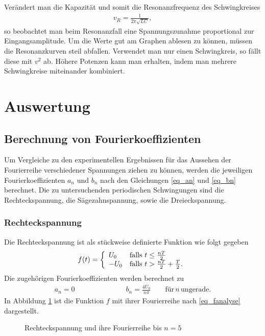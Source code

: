 Verändert man die Kapazität und somit die Resonanzfrequenz des Schwingkreises
\begin{align}
v_R=\frac{1}{2\pi\sqrt{LC}},
\end{align}
so beobachtet man beim Resonanzfall eine Spannungszunahme proportional zur Eingangsamplitude. Um die Werte gut am Graphen ablesen zu können, müssen die Resonanzkurven steil abfallen. Verwendet man nur einen Schwingkreis, so fällt diese mit $v^2$ ab. Höhere Potenzen kann man erhalten, indem man mehrere Schwingkreise miteinander kombiniert.
\section{Auswertung}
\subsection{Berechnung von Fourierkoeffizienten}
\label{sec_berechnung}
Um Vergleiche zu den experimentellen Ergebnissen für das Aussehen der Fourierreihe verschiedener Spannungen ziehen zu können, werden
die jeweiligen Fourierkoeffizienten $a_n$ und $b_n$ nach den Gleichungen \eqref{eq_an} und \eqref{eq_bn} berechnet. Die zu untersuchenden
periodischen Schwingungen sind die Rechteckspannung, die Sägezahnspannung, sowie die Dreieckspannung. 
\subsubsection{Rechteckspannung}
Die Rechteckspannung ist als stückweise definierte Funktion wie folgt gegeben
\begin{align*}			
f(t) =
\left\{
	\begin{array}{l l}
	U_0  & \text{falls } t \leq \frac{nT}{2}\\
	-U_0 & \text{falls } t > \frac{nT}{2}+\frac{T}{2}.
	\end{array}
\right.
\end{align*}
Die zugehörigen Fourierkoeffizienten werden berechnet zu
\begin{align}
 a_n = 0 \hspace{3cm} b_n = \frac{4U_0}{n \pi} \qquad \text{für}\, n\, \text{ungerade}.
\end{align}
In Abbildung \ref{pic_rechteckfourier} ist die Funktion $f$ mit ihrer Fourierreihe nach \eqref{eq_fanalyse} dargestellt.
\begin{figure}[H]
 
 \caption{Rechteckspannung und ihre Fourierreihe bis $n=5$}
 \label{pic_rechteckfourier}
\end{figure}

